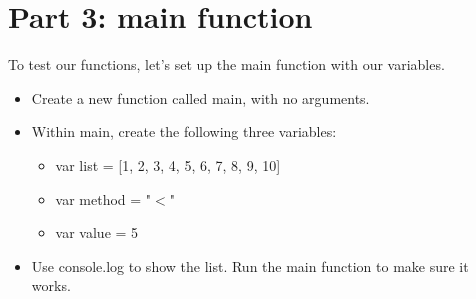 \documentclass{article}
\begin{document}
\section*{Part 3: main function}
To test our functions, let's set up the main function with our variables.
\begin{itemize}
    \item Create a new function called main, with no arguments.
    \item Within main, create the following three variables:
    \begin{itemize}
    		\item var list = [1, 2, 3, 4, 5, 6, 7, 8, 9, 10]
    		\item var method = "$<$"
    		\item var value = 5
    	\end{itemize}
    	\item Use console.log to show the list.  Run the main function to make sure it works.
\end{itemize}
\end{document}
